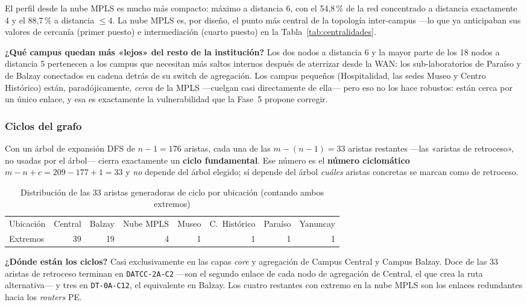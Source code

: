 \documentclass[10pt,a4paper]{extarticle}
\newcommand{\code}[1]{\texttt{\small #1}}
\begin{document}
El perfil desde la nube MPLS es mucho más compacto: máximo a distancia 6, con el 54,8\,\%
de la red concentrado a distancia exactamente 4 y el 88,7\,\% a distancia $\le 4$. La nube
MPLS es, por diseño, el punto más central de la topología inter-campus ---lo que ya
anticipaban sus valores de cercanía (primer puesto) e intermediación (cuarto puesto) en la
Tabla~\ref{tab:centralidades}.

\textbf{¿Qué campus quedan más «lejos» del resto de la institución?} Los dos nodos a
distancia 6 y la mayor parte de los 18 nodos a distancia 5 pertenecen a los campus que
necesitan más saltos internos después de aterrizar desde la WAN: los sub-laboratorios de
Paraíso y de Balzay conectados en cadena detrás de su switch de agregación. Los campus
pequeños (Hospitalidad, las sedes Museo y Centro Histórico) están, paradójicamente,
\textit{cerca} de la MPLS ---cuelgan casi directamente de ella--- pero eso no los hace
robustos: están cerca por un único enlace, y esa es exactamente la vulnerabilidad que la
Fase~5 propone corregir.

\subsubsection{Ciclos del grafo}

Con un árbol de expansión DFS de $n-1 = 176$ aristas, cada una de las $m-(n-1) = 33$
aristas restantes ---las «aristas de retroceso», no usadas por el árbol--- cierra
exactamente un \textbf{ciclo fundamental}. Ese número es el \textbf{número ciclomático}
$m - n + c = 209 - 177 + 1 = 33$ y \textit{no} depende del árbol elegido; sí depende del
árbol \textit{cuáles} aristas concretas se marcan como de retroceso.

\begin{table}[H]
\centering
\caption{Distribución de las 33 aristas generadoras de ciclo por ubicación (contando ambos extremos)}
\label{tab:ciclos}
\small
\begin{adjustbox}{max width=\textwidth}
\begin{tabular}{lrrrrrrr}
\toprule
Ubicación & Central & Balzay & Nube MPLS & Museo & C.\ Histórico & Paraíso & Yanuncay \\
Extremos  & 39 & 19 & 4 & 1 & 1 & 1 & 1 \\
\bottomrule
\end{tabular}
\end{adjustbox}
\end{table}

\textbf{¿Dónde están los ciclos?} Casi exclusivamente en las capas \textit{core} y
agregación de Campus Central y Campus Balzay. Doce de las 33 aristas de retroceso terminan
en \code{DATCC-2A-C2} ---son el segundo enlace de cada nodo de agregación de Central, el
que crea la ruta alternativa--- y tres en \code{DT-0A-C12}, el equivalente en Balzay. Los
cuatro restantes con extremo en la nube MPLS son los enlaces redundantes hacia los
\textit{routers} PE.
\end{document}
